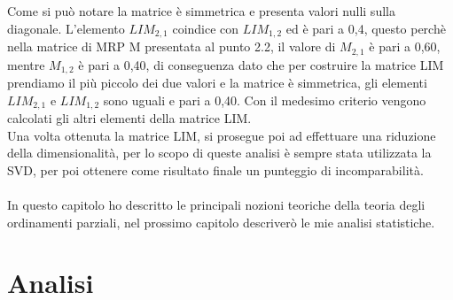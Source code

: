 \documentclass[a4paper,12pt, openright]{report}
\begin{document}
Come si può notare la matrice è simmetrica e presenta valori nulli sulla diagonale. L'elemento $LIM_{2,1}$ coindice con $LIM_{1,2}$ ed è pari a 0,4, questo perchè
nella matrice di MRP M presentata al punto 2.2, il valore di $M_{2,1}$ è pari a 0,60, mentre $M_{1,2}$ è pari a 0,40, di conseguenza dato che per costruire
la matrice LIM prendiamo il più piccolo dei due valori e la matrice è simmetrica, gli elementi $LIM_{2,1}$ e $LIM_{1,2}$ sono uguali e pari a 0,40. Con il medesimo
criterio vengono calcolati gli altri elementi della matrice LIM. \\
Una volta ottenuta la matrice LIM, si prosegue poi ad effettuare una riduzione della dimensionalità, per lo scopo di queste analisi è sempre stata utilizzata la SVD, 
per poi ottenere come risultato finale un punteggio di incomparabilità. \\
\\
In questo capitolo ho descritto le principali nozioni teoriche della teoria degli ordinamenti parziali, nel prossimo capitolo descriverò le mie analisi statistiche. 
\newpage

\chapter{Analisi}
\end{document}
